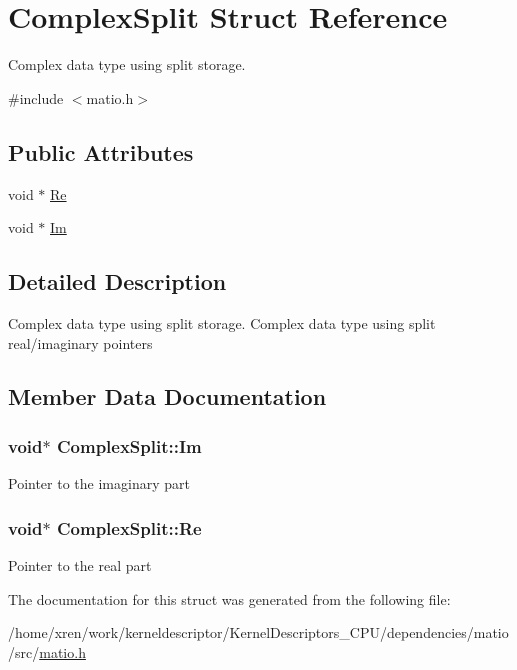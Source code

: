 \hypertarget{structComplexSplit}{
\section{ComplexSplit Struct Reference}
\label{structComplexSplit}
}


Complex data type using split storage.  




{\ttfamily \#include $<$matio.h$>$}

\subsection*{Public Attributes}
\begin{DoxyCompactItemize}
\item 
void $\ast$ \hyperlink{structComplexSplit_ab9c3f2544c4325a372300d4546e374a8}{Re}
\item 
void $\ast$ \hyperlink{structComplexSplit_abdf9792203bd776fb6be4ceebf078402}{Im}
\end{DoxyCompactItemize}


\subsection{Detailed Description}
Complex data type using split storage. Complex data type using split real/imaginary pointers 

\subsection{Member Data Documentation}
\hypertarget{structComplexSplit_abdf9792203bd776fb6be4ceebf078402}{
\subsubsection[{Im}]{\setlength{\rightskip}{0pt plus 5cm}void$\ast$ {\bf ComplexSplit::Im}}}
\label{structComplexSplit_abdf9792203bd776fb6be4ceebf078402}
Pointer to the imaginary part \hypertarget{structComplexSplit_ab9c3f2544c4325a372300d4546e374a8}{
\subsubsection[{Re}]{\setlength{\rightskip}{0pt plus 5cm}void$\ast$ {\bf ComplexSplit::Re}}}
\label{structComplexSplit_ab9c3f2544c4325a372300d4546e374a8}
Pointer to the real part 

The documentation for this struct was generated from the following file:\begin{DoxyCompactItemize}
\item 
/home/xren/work/kerneldescriptor/KernelDescriptors\_\-CPU/dependencies/matio/src/\hyperlink{matio_8h}{matio.h}\end{DoxyCompactItemize}

